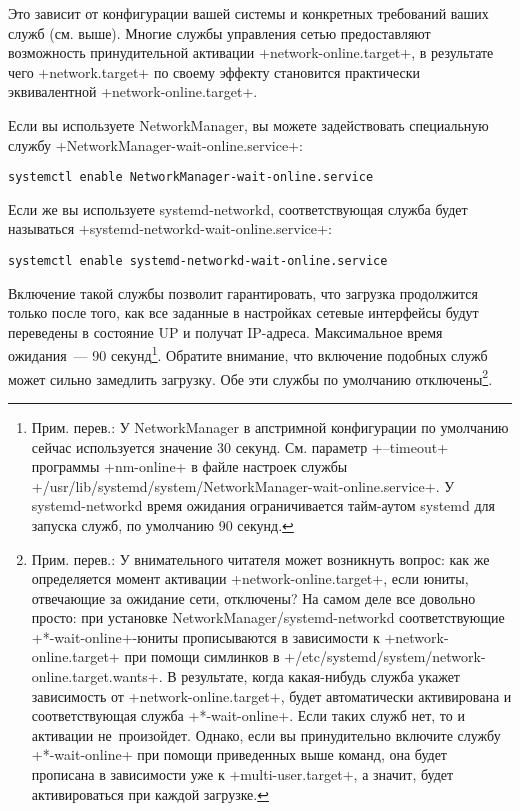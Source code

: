 \documentclass[10pt,oneside,a4paper]{article}
\begin{document}
Это зависит от конфигурации вашей системы и конкретных требований ваших служб
(см. выше). Многие службы управления сетью предоставляют возможность
принудительной активации +network-online.target+, в результате чего
+network.target+ по своему эффекту становится практически эквивалентной 
+network-online.target+.

Если вы используете NetworkManager, вы можете задействовать
специальную службу +NetworkManager-wait-online.service+:
\begin{Verbatim}
systemctl enable NetworkManager-wait-online.service
\end{Verbatim}

Если же вы используете systemd-networkd, соответствующая служба будет называться 
+systemd-networkd-wait-online.service+:
\begin{Verbatim}
systemctl enable systemd-networkd-wait-online.service
\end{Verbatim}

Включение такой службы позволит гарантировать, что загрузка продолжится только
после того, как все заданные в настройках сетевые интерфейсы будут переведены
в состояние UP и получат IP-адреса. Максимальное время ожидания~--- 90
секунд\footnote{Прим. перев.: У NetworkManager в апстримной конфигурации по
умолчанию сейчас используется значение 30 секунд. См. параметр +--timeout+
программы +nm-online+ в файле настроек службы
+/usr/lib/systemd/system/NetworkManager-wait-online.service+. У systemd-networkd
время ожидания ограничивается тайм-аутом systemd для запуска служб, по умолчанию
90 секунд.}.
Обратите внимание, что включение подобных служб может сильно замедлить загрузку.
Обе эти службы по умолчанию отключены\footnote{Прим. перев.: У внимательного
читателя может возникнуть вопрос: как же определяется момент активации
+network-online.target+, если юниты, отвечающие за ожидание сети, отключены? На
самом деле все довольно просто: при установке NetworkManager/systemd-networkd
соответствующие +*-wait-online+-юниты прописываются в зависимости к
+network-online.target+ при помощи симлинков в
+/etc/systemd/system/network-online.target.wants+. В результате, когда
какая-нибудь служба укажет зависимость от +network-online.target+, будет
автоматически активирована и соответствующая служба +*-wait-online+. Если таких
служб нет, то и активации не~произойдет. Однако, если вы принудительно включите
службу +*-wait-online+ при помощи приведенных выше команд, она будет прописана
в зависимости уже к +multi-user.target+, а значит, будет активироваться при
каждой загрузке.}.
\end{document}
